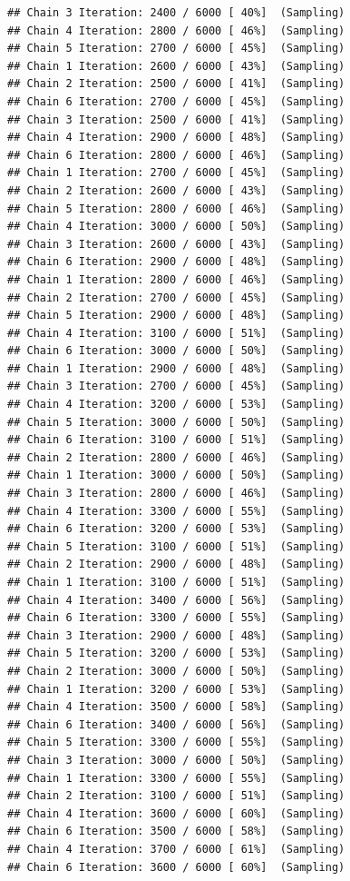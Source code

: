 \documentclass[
]{article}
\begin{document}
\begin{verbatim}
## Chain 3 Iteration: 2400 / 6000 [ 40%]  (Sampling) 
## Chain 4 Iteration: 2800 / 6000 [ 46%]  (Sampling) 
## Chain 5 Iteration: 2700 / 6000 [ 45%]  (Sampling) 
## Chain 1 Iteration: 2600 / 6000 [ 43%]  (Sampling) 
## Chain 2 Iteration: 2500 / 6000 [ 41%]  (Sampling) 
## Chain 6 Iteration: 2700 / 6000 [ 45%]  (Sampling) 
## Chain 3 Iteration: 2500 / 6000 [ 41%]  (Sampling) 
## Chain 4 Iteration: 2900 / 6000 [ 48%]  (Sampling) 
## Chain 6 Iteration: 2800 / 6000 [ 46%]  (Sampling) 
## Chain 1 Iteration: 2700 / 6000 [ 45%]  (Sampling) 
## Chain 2 Iteration: 2600 / 6000 [ 43%]  (Sampling) 
## Chain 5 Iteration: 2800 / 6000 [ 46%]  (Sampling) 
## Chain 4 Iteration: 3000 / 6000 [ 50%]  (Sampling) 
## Chain 3 Iteration: 2600 / 6000 [ 43%]  (Sampling) 
## Chain 6 Iteration: 2900 / 6000 [ 48%]  (Sampling) 
## Chain 1 Iteration: 2800 / 6000 [ 46%]  (Sampling) 
## Chain 2 Iteration: 2700 / 6000 [ 45%]  (Sampling) 
## Chain 5 Iteration: 2900 / 6000 [ 48%]  (Sampling) 
## Chain 4 Iteration: 3100 / 6000 [ 51%]  (Sampling) 
## Chain 6 Iteration: 3000 / 6000 [ 50%]  (Sampling) 
## Chain 1 Iteration: 2900 / 6000 [ 48%]  (Sampling) 
## Chain 3 Iteration: 2700 / 6000 [ 45%]  (Sampling) 
## Chain 4 Iteration: 3200 / 6000 [ 53%]  (Sampling) 
## Chain 5 Iteration: 3000 / 6000 [ 50%]  (Sampling) 
## Chain 6 Iteration: 3100 / 6000 [ 51%]  (Sampling) 
## Chain 2 Iteration: 2800 / 6000 [ 46%]  (Sampling) 
## Chain 1 Iteration: 3000 / 6000 [ 50%]  (Sampling) 
## Chain 3 Iteration: 2800 / 6000 [ 46%]  (Sampling) 
## Chain 4 Iteration: 3300 / 6000 [ 55%]  (Sampling) 
## Chain 6 Iteration: 3200 / 6000 [ 53%]  (Sampling) 
## Chain 5 Iteration: 3100 / 6000 [ 51%]  (Sampling) 
## Chain 2 Iteration: 2900 / 6000 [ 48%]  (Sampling) 
## Chain 1 Iteration: 3100 / 6000 [ 51%]  (Sampling) 
## Chain 4 Iteration: 3400 / 6000 [ 56%]  (Sampling) 
## Chain 6 Iteration: 3300 / 6000 [ 55%]  (Sampling) 
## Chain 3 Iteration: 2900 / 6000 [ 48%]  (Sampling) 
## Chain 5 Iteration: 3200 / 6000 [ 53%]  (Sampling) 
## Chain 2 Iteration: 3000 / 6000 [ 50%]  (Sampling) 
## Chain 1 Iteration: 3200 / 6000 [ 53%]  (Sampling) 
## Chain 4 Iteration: 3500 / 6000 [ 58%]  (Sampling) 
## Chain 6 Iteration: 3400 / 6000 [ 56%]  (Sampling) 
## Chain 5 Iteration: 3300 / 6000 [ 55%]  (Sampling) 
## Chain 3 Iteration: 3000 / 6000 [ 50%]  (Sampling) 
## Chain 1 Iteration: 3300 / 6000 [ 55%]  (Sampling) 
## Chain 2 Iteration: 3100 / 6000 [ 51%]  (Sampling) 
## Chain 4 Iteration: 3600 / 6000 [ 60%]  (Sampling) 
## Chain 6 Iteration: 3500 / 6000 [ 58%]  (Sampling) 
## Chain 4 Iteration: 3700 / 6000 [ 61%]  (Sampling) 
## Chain 6 Iteration: 3600 / 6000 [ 60%]  (Sampling) 

\end{verbatim}
\end{document}
